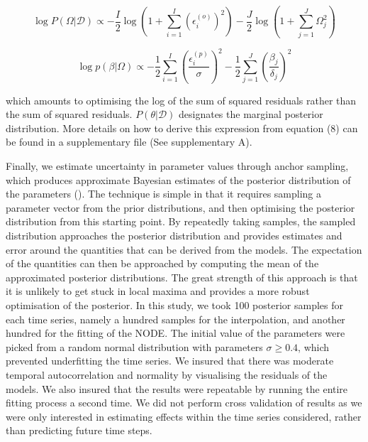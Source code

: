 \documentclass[11pt, oneside]{article}
\begin{document}
\begin{equation}
    \log P(\Omega | \mathcal{D}) \propto - \frac{I}{2} \log \left(1 + \sum_{i=1}^{I} \left( \epsilon^{(o)}_i \right)^2 \right) - \frac{J}{2} \log \left(1 + \sum_{j=1}^{J} \Omega_{j}^2 \right)
\end{equation}

\begin{equation}
    \log p(\beta | \Omega) \propto - \frac{1}{2} \sum_{i=1}^{I} \left( \frac{\epsilon^{(p)}_i}{\sigma} \right)^2 - \frac{1}{2} \sum_{j=1}^{J} \left( \frac{\beta_j}{\delta_j} \right)^2
\end{equation}


which amounts to optimising the log of the sum of squared residuals rather than the sum of squared residuals. $P(\theta | \mathcal{D})$ designates the marginal posterior distribution. 
More details on how to derive this expression from equation (8) can be found in a supplementary file (See supplementary A).

Finally, we estimate uncertainty in parameter values through anchor sampling, which produces approximate Bayesian estimates of the posterior distribution of the parameters (\cite{Pearce2018}).
The technique is simple in that it requires sampling a parameter vector from the prior distributions, and then optimising the posterior distribution from this starting point.
By repeatedly taking samples, the sampled distribution approaches the posterior distribution and provides estimates and error around the quantities that can be derived from the models.
The expectation of the quantities can then be approached by computing the mean of the approximated posterior distributions.
The great strength of this approach is that it is unlikely to get stuck in local maxima and provides a more robust optimisation of the posterior.
In this study, we took 100 posterior samples for each time series, namely a hundred samples for the interpolation, and another hundred for the fitting of the NODE.
The initial value of the parameters were picked from a random normal distribution with parameters $\sigma \geq 0.4$, which prevented underfitting the time series.
We insured that there was moderate temporal autocorrelation and normality by visualising the residuals of the models.
We also insured that the results were repeatable by running the entire fitting process a second time.
We did not perform cross validation of results as we were only interested in estimating effects within the time series considered, rather than predicting future time steps.
\end{document}
